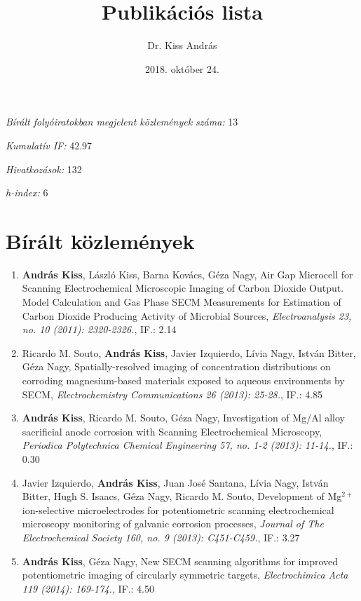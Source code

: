\documentclass[11pt,a4paper,roman]{article}
\date{2018. október 24.}
\title{Publikációs lista}
\author{Dr. Kiss András}
\begin{document}
\maketitle

\emph{Bírált folyóiratokban megjelent közlemények száma:} 13

\emph{Kumulatív IF:} 42.97

\emph{Hivatkozások:} 132

\emph{h-index:} 6

\section{Bírált közlemények}
\begin{enumerate}

\item \textbf{András Kiss}, László Kiss, Barna Kovács, Géza Nagy, Air Gap Microcell for Scanning Electrochemical Microscopic Imaging of Carbon Dioxide Output. Model Calculation and Gas Phase SECM Measurements for Estimation of Carbon Dioxide Producing Activity of Microbial Sources, \emph{Electroanalysis 23, no. 10 (2011): 2320-2326.}, IF.: 2.14

\item Ricardo M. Souto, \textbf{András Kiss}, Javier Izquierdo, Lívia Nagy, István Bitter, Géza Nagy, Spatially-resolved imaging of concentration distributions on corroding mag\-ne\-si\-um-based materials exposed to aqueous environments by SECM, \emph{Electrochemistry Communications 26 (2013): 25-28.}, IF.: 4.85

\item \textbf{András Kiss}, Ricardo M. Souto, Géza Nagy, Investigation of Mg/Al alloy sacrificial anode corrosion with Scanning Electrochemical Microscopy, \emph{Periodica Polytechnica Chemical Engineering 57, no. 1-2 (2013): 11-14.}, IF.: 0.30

\item Javier Izquierdo, \textbf{András Kiss}, Juan José Santana, Lívia Nagy, István Bitter, Hugh S. Isaacs, Géza Nagy, Ricardo M. Souto, Development of Mg$^{2+}$ ion-selective microelectrodes for potentiometric scanning electrochemical microscopy monitoring of galvanic corrosion processes, \emph{Journal of The Electrochemical Society 160, no. 9 (2013): C451-C459.}, IF.: 3.27

\item \textbf{András Kiss}, Géza Nagy, New SECM scanning algorithms for improved potentiometric imaging of circularly symmetric targets, \emph{Electrochimica Acta 119 (2014): 169-174.}, IF.: 4.50


\end{enumerate}
\end{document}
